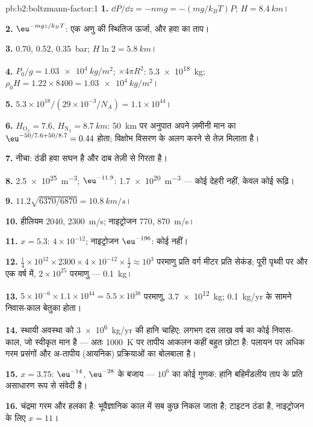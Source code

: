 \begin{solution}{pb:b2:boltzmann-factor:1}
\textbf{1.} $\dd P/\dd z = -nmg = -(mg/k_BT)P$; $H = \qty{8.4}{km}$।

\textbf{2.} $\eu^{-mgz/k_BT}$: एक अणु की स्थितिज ऊर्जा, और
हवा का ताप।

\textbf{3.} \qty{0.70}{}, \qty{0.52}{}, \qty{0.35}{bar}; $H\ln 2 = \qty{5.8}{km}$।

\textbf{4.} $P_0/g = \qty{1.03e4}{kg/m^2}$; $\times 4\pi R^2$: \qty{5.3e18}{kg}; $\rho_0H =
1.22 \times 8400 = \qty{1.03e4}{kg/m^2}$।

\textbf{5.} $5.3 \times 10^{18}/(29 \times 10^{-3}/N_A) = 1.1 \times 10^{44}$।

\textbf{6.} $H_{\text{O}_2} = 7.6$, $H_{\text{N}_2} = \qty{8.7}{km}$: \qty{50}{km} पर अनुपात
अपने ज़मीनी मान का $\eu^{-50/7.6 + 50/8.7} = 0.44$ होता; विक्षोभ विसरण के
अलग करने से तेज़ मिलाता है।

\textbf{7.} नीचा: ठंडी हवा सघन है और दाब तेज़ी से गिरता है।

\textbf{8.} \qty{2.5e25}{m^{-3}}; $\eu^{-11.9}$: \qty{1.7e20}{m^{-3}} --- कोई देहरी नहीं, केवल कोई
रूढ़ि।

\textbf{9.} $11.2\sqrt{6370/6870} = \qty{10.8}{km/s}$।

\textbf{10.} हीलियम \qty{2040}{}, \qty{2300}{m/s}; नाइट्रोजन \qty{770}{}, \qty{870}{m/s}।

\textbf{11.} $x = 5.3$: $4 \times 10^{-12}$; नाइट्रोजन $\eu^{-196}$: कोई नहीं।

\textbf{12.} $\tfrac14 \times 10^{12} \times 2300 \times 4 \times 10^{-12} \times \tfrac12 \approx
10^3$ परमाणु प्रति वर्ग मीटर प्रति सेकंड; पूरी पृथ्वी पर और एक वर्ष में,
$2 \times 10^{25}$ परमाणु --- \qty{0.1}{kg}।

\textbf{13.} $5 \times 10^{-6} \times 1.1 \times 10^{44} = 5.5 \times 10^{38}$ परमाणु, \qty{3.7e12}{kg};
\qty{0.1}{kg/yr} के सामने निवास-काल बेतुका होता।

\textbf{14.} स्थायी अवस्था को \qty{3e6}{kg/yr} की हानि चाहिए: लगभग दस लाख
वर्ष का कोई निवास-काल, जो स्वीकृत मान है --- अतः \qty{1000}{K} पर
तापीय आकलन कहीं बहुत छोटा है: पलायन पर
अधिक गरम प्रसंगों और अ-तापीय (आयनिक) प्रक्रियाओं का बोलबाला है।

\textbf{15.} $x = 3.75$: $\eu^{-14}$, $\eu^{-28}$ के बजाय --- $10^6$ का कोई गुणक:
हानि बहिर्मंडलीय ताप के प्रति असाधारण रूप से संवेदी है।

\textbf{16.} चंद्रमा गरम और हलका है: भूवैज्ञानिक काल में सब कुछ
निकल जाता है; टाइटन ठंडा है, नाइट्रोजन के लिए $x = 11$।


\end{solution}
